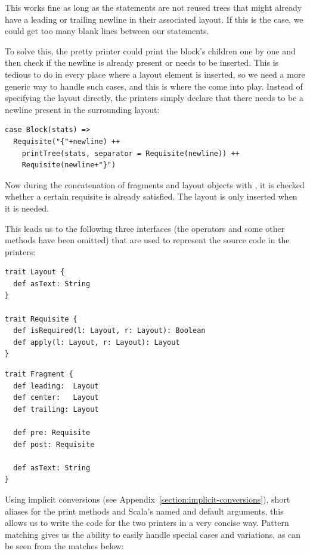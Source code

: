 This works fine as long as the statements are not reused trees that might already have a leading or trailing newline in their associated layout. If this is the case, we could get too many blank lines between our statements. 

To solve this, the pretty printer could print the block's children one by one and then check if the newline is already present or needs to be inserted. This is tedious to do in every place where a layout element is inserted, so we need a more generic way to handle such cases, and this is where the  come into play. Instead of specifying the layout directly, the printers simply declare that there needs to be a newline present in the surrounding layout:

\begin{lstlisting}
case Block(stats) =>
  Requisite("{"+newline) ++ 
    printTree(stats, separator = Requisite(newline)) ++ 
    Requisite(newline+"}")
\end{lstlisting}

Now during the concatenation of fragments and layout objects with \src{++}, it is checked whether a certain requisite is already satisfied. The  layout is only inserted when it is needed.

This leads us to the following three interfaces (the \src{++} operators and some other methods have been omitted) that are used to represent the source code in the printers:

\begin{lstlisting}
trait Layout {
  def asText: String
}

trait Requisite {  
  def isRequired(l: Layout, r: Layout): Boolean
  def apply(l: Layout, r: Layout): Layout
}
\end{lstlisting}
\begin{lstlisting}
trait Fragment {
  def leading:  Layout
  def center:   Layout
  def trailing: Layout
  
  def pre: Requisite
  def post: Requisite
  
  def asText: String
}
\end{lstlisting}

Using implicit conversions (see Appendix~\vref{section:implicit-conversions}), short aliases for the print methods and Scala's named and default arguments, this allows us to write the code for the two printers in a very concise way. Pattern matching gives us the ability to easily handle special cases and variations, as can be seen from the  matches below:

